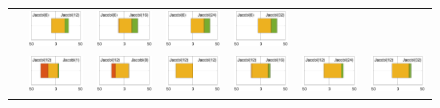 \begin{landscape}
\begin{figure}[p]
\begin{tabular}{c|cccccc}
&
\includegraphics[width=.135\columnwidth]{plots/Jacobi(8)_vs_Jacobi(12).pdf}
&
\includegraphics[width=.135\columnwidth]{plots/Jacobi(8)_vs_Jacobi(16).pdf}
&
\includegraphics[width=.135\columnwidth]{plots/Jacobi(8)_vs_Jacobi(24).pdf}
&
\includegraphics[width=.135\columnwidth]{plots/Jacobi(8)_vs_Jacobi(32).pdf}
\\
\parbox[c]{5pt}{}
&
\includegraphics[width=.135\columnwidth]{plots/Jacobi(12)_vs_Jacobi(1).pdf}
&
\includegraphics[width=.135\columnwidth]{plots/Jacobi(12)_vs_Jacobi(8).pdf}
&
\includegraphics[width=.135\columnwidth]{plots/Jacobi(12)_vs_Jacobi(12).pdf}
&
\includegraphics[width=.135\columnwidth]{plots/Jacobi(12)_vs_Jacobi(16).pdf}
&
\includegraphics[width=.135\columnwidth]{plots/Jacobi(12)_vs_Jacobi(24).pdf}
&
\includegraphics[width=.135\columnwidth]{plots/Jacobi(12)_vs_Jacobi(32).pdf}

\end{tabular}
\end{figure}
\end{landscape}
